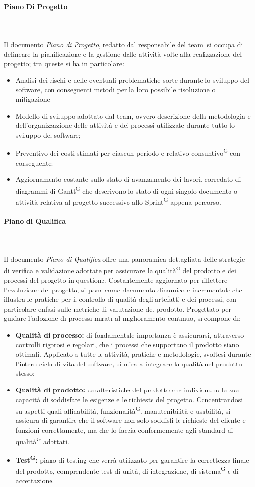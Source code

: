\documentclass[8pt]{article}
\newcommand{\glossterm}[1]{#1\textsuperscript{G}} %
\newcommand{\subsubsubsection}[1]{\paragraph{#1}\mbox{}\\}
\begin{document}
\subsubsubsection{Piano Di Progetto}\\
Il documento \textit{Piano di Progetto}, redatto dal responsabile del team, si occupa di delineare la pianificazione e la gestione delle attività volte alla realizzazione del progetto; tra queste si ha in particolare:
\begin{itemize}
    \item Analisi dei rischi e delle eventuali problematiche sorte durante lo sviluppo del software, con conseguenti metodi per la loro possibile risoluzione o mitigazione;
    \item Modello di sviluppo adottato dal team, ovvero descrizione della metodologia e dell'organizzazione delle attività e dei processi utilizzate durante tutto lo sviluppo del software; 
    \item Preventivo dei costi stimati per ciascun periodo e relativo \glossterm{consuntivo} con conseguente:
    \item Aggiornamento costante sullo stato di avanzamento dei lavori, corredato di diagrammi di \glossterm{Gantt} che descrivono lo stato di ogni singolo documento o attività relativa al progetto successivo allo \glossterm{Sprint} appena percorso.
\end{itemize}

\subsubsubsection{Piano di Qualifica}\\
Il documento \textit{Piano di Qualifica} offre una panoramica dettagliata delle strategie di verifica e validazione adottate per assicurare la \glossterm{qualità} del prodotto e dei processi del progetto in questione. Costantemente aggiornato per riflettere l'evoluzione del progetto, si pone come documento dinamico e incrementale che illustra le pratiche per il controllo di qualità degli artefatti e dei processi, con particolare enfasi sulle metriche di valutazione del prodotto. Progettato per guidare l'adozione di processi mirati al miglioramento continuo, si compone di:
\begin{itemize}
    \item \textbf{Qualità di processo:} di fondamentale importanza è assicurarsi, attraverso controlli rigorosi e regolari, che i processi che supportano il prodotto siano ottimali. Applicato a tutte le attività, pratiche e metodologie, svoltesi durante l'intero ciclo di vita del software, si mira a integrare la qualità nel prodotto stesso;
    \item \textbf{Qualità di prodotto:} caratteristiche del prodotto che individuano la sua capacità di soddisfare le esigenze e le richieste del progetto. Concentrandosi su aspetti quali affidabilità, \glossterm{funzionalità}, manutenibilità e usabilità, si assicura di garantire che il software non solo soddisfi le richieste del cliente e funzioni correttamente, ma che lo faccia conformemente agli standard di \glossterm{qualità} adottati.
    \item \textbf{\glossterm{Test}:} piano di testing che verrà utilizzato per garantire la correttezza finale del prodotto, comprendente test di unità, di integrazione, di \glossterm{sistema} e di accettazione.
\end{itemize} 
\end{document}
